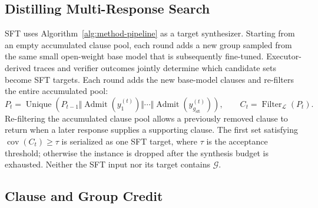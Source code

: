 \subsection{Distilling Multi-Response Search}
\label{sec:method:sft}

SFT uses Algorithm~\ref{alg:method-pipeline} as a target synthesizer.  Starting
from an empty accumulated clause pool, each round adds a new group sampled
from the same small open-weight base model that is subsequently fine-tuned.
Executor-derived traces and verifier outcomes jointly determine which
candidate sets become SFT targets.  Each round adds the new base-model clauses
and re-filters the entire accumulated pool:
\begin{equation}
  P_t=\operatorname{Unique}\!\left(P_{t-1}\Vert
    \operatorname{Admit}(y_1^{(t)})\Vert\cdots\Vert
    \operatorname{Admit}(y_{g_{\mathrm{sft}}}^{(t)})\right),
  \qquad
  C_t=\operatorname{Filter}_{\mathcal L}(P_t).
  \label{eq:method-sft}
\end{equation}
Re-filtering the accumulated clause pool allows a previously removed clause to return when a
later response supplies a supporting clause.  The first set satisfying
\(\operatorname{cov}(C_t)\ge\tau\) is serialized as one SFT target, where
\(\tau\) is the acceptance threshold; otherwise the instance is dropped after
the synthesis budget is exhausted.  Neither the SFT input nor its target
contains \(\mathcal G\).

\subsection{Clause and Group Credit}
\label{sec:method:reward}

